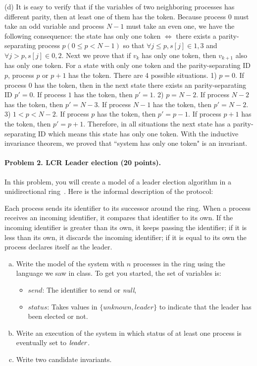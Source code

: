 \documentclass[11pt]{article}
\begin{document}
(d) It is easy to verify that if the variables of two neighboring processes has different parity, then at least one of them has the token. Because process $0$ must take an odd variable and process $N-1$ must take an even one, we have the following consequence: the state has only one token $\iff$ there exists a parity-separating process $p (0 \le p < N-1)$ so that $\forall j \le p, s[j] \in {1,3}$ and $\forall j > p, s[j] \in {0,2}$. Next we prove that if $v_k$ has only one token, then $v_{k+1}$ also has only one token. For a state with only one token and the parity-separating ID $p$, process $p$ or $p+1$ has the token. There are 4 possible situations. 1) $p=0$. If process $0$ has the token, then in the next state there exists an parity-separating ID $p'=0$. If process $1$ has the token, then $p'=1$. 2) $p=N-2$. If process $N-2$ has the token, then $p'=N-3$. If process $N-1$ has the token, then $p'=N-2$. 3) $1<p<N-2$. If process $p$ has the token, then $p'=p-1$. If process $p+1$ has the token, then $p'=p+1$. Therefore, in all situations the next state has a parity-separating ID which means this state has only one token. With the inductive invariance theorem, we proved that ``system has only one token" is an invariant.

\paragraph{Problem 2. LCR Leader election (20 points).}
In this problem, you will create a model of a leader election algorithm in a unidirectional ring~\cite{lynch1996a}. Here is the informal description of the protocol:

Each process sends its identifier to its successor around the ring. When a process receives an incoming identifier, it compares that identifier to its own. If the incoming identifier is greater than its own, it keeps passing the identifier; if it is less than its own, it discards the incoming identifier; if it is equal to its own the process declares itself as the leader.

\begin{enumerate}[(a)]
\item Write the model of the system with $n$ processes in the ring using the language we saw in class. To get you started, the set of variables is:
\begin{itemize}
\item $\mathit{send}$: The identifier to send or {\em null\/},
\item $\mathit{status}$: Takes values in $\{ \mathit{unknown},\mathit{leader}\}$ to indicate that the leader has been elected or not.
\end{itemize}

\item Write an execution of the system in which status of at least one process is eventually set to $\mathit{leader\/}$.
\item Write two candidate invariants.
\end{enumerate}
\end{document}
